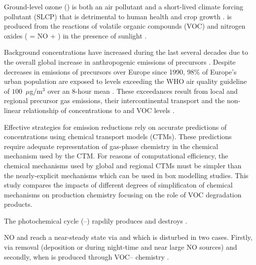 Ground-level ozone () is both an air pollutant and a short-lived climate forcing pollutant (SLCP) that is detrimental to human health and crop growth \citep{AQEU:2014}. 
 is produced from the reactions of volatile organic compounds (VOC) and nitrogen oxides ( = NO + ) in the presence of sunlight \citep{Atkinson:2000}.

Background  concentrations have increased during the last several decades due to the overall global increase in anthropogenic emissions of  precursors \citep{HTAP:2010}.
Despite decreases in emissions of  precursors over Europe since 1990, $98$\% of Europe's urban population are exposed to levels exceeding the WHO air quality guideline of \mbox{$100$ $\mu$g/m$^3$} over an \mbox{$8$-hour} mean \citep{WHO:2006}. 
These exceedances result from local and regional  precursor gas emissions, their intercontinental transport and the non-linear relationship of  concentrations to  and VOC levels \citep{AQEU:2014}.

Effective strategies for emission reductions rely on accurate predictions of  concentrations using chemical transport models (CTMs). 
These predictions require adequate representation of gas-phase chemistry in the chemical mechanism used by the CTM. 
For reasons of computational efficiency, the chemical mechanisms used by global and regional CTMs must be simpler than the nearly-explicit mechanisms which can be used in box modelling studies.
This study compares the impacts of different degrees of simplificaton of chemical mechanisms on  production chemistry focusing on the role of VOC degradation products.

The photochemical cycle (--) rapdily produces and destroys . 
\begin{reactionlist}
\end{reactionlist}
NO and  reach a near-steady state via  and  which is disturbed in two cases. 
Firstly, via  removal (deposition or  during night-time and near large NO sources) and secondly, when  is produced through VOC-- chemistry \citep{Sillman:1999}.

